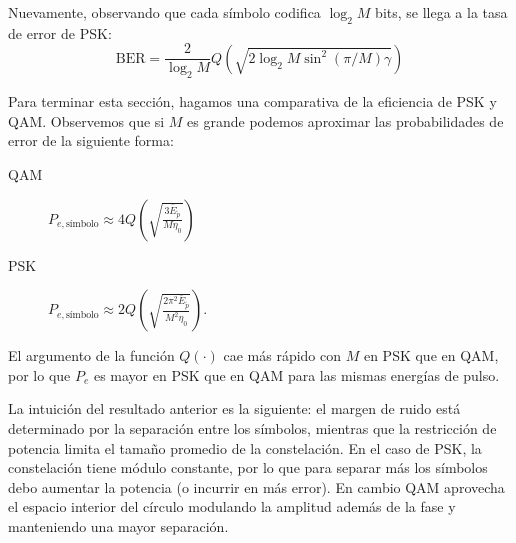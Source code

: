 \begin{ejemplo}[$M-$PSK]
    Nuevamente, observando que cada símbolo codifica $\log_2 M$ bits, se llega a la tasa de error de PSK:
    \begin{equation*}
        \mathrm{BER} = \frac{2}{\log_2 M}Q\left(\sqrt{2\log_2M \sin^2(\pi/M)\gamma}\right) 
    \end{equation*}

    \begin{center}
    \end{center}
\end{ejemplo}

Para terminar esta sección, hagamos una comparativa de la eficiencia de PSK y QAM. Observemos que si $M$ es grande podemos aproximar las probabilidades de error de la siguiente forma:
\begin{description}
    \item[QAM] $P_{e,\text{símbolo}}\approx 4 Q\left(\sqrt{\frac{3\bar{E}_{\tilde{p}}}{M\eta_0}}\right)$
    \item[PSK] $P_{e,\text{símbolo}}\approx 2 Q\left(\sqrt{\frac{2\pi^2\bar{E}_{\tilde{p}}}{M^2\eta_0}}\right)$.
 \end{description}
El argumento de la función $Q(\cdot)$ cae más rápido con $M$ en PSK que en QAM, por lo que $P_e$ es mayor en PSK que en QAM para las mismas energías de pulso.

La intuición del resultado anterior es la siguiente: el margen de ruido está determinado por la separación entre los símbolos, mientras que la restricción de potencia limita el tamaño promedio de la constelación. En el caso de PSK, la constelación tiene módulo constante, por lo que para separar más los símbolos debo aumentar la potencia (o incurrir en más error). En cambio QAM aprovecha el espacio interior del círculo modulando la amplitud además de la fase y manteniendo una mayor separación.

